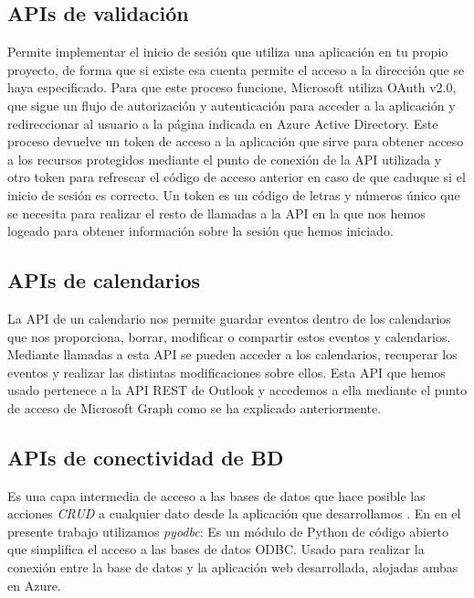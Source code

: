 \subsection{APIs de validación}
Permite implementar el inicio de sesión que utiliza una aplicación en tu propio proyecto, de forma que si existe esa cuenta permite el acceso a la dirección que se haya especificado. Para que este proceso funcione, Microsoft utiliza OAuth v2.0, que sigue un flujo de autorización y autenticación para acceder a la aplicación y redireccionar al usuario a la página indicada en Azure Active Directory. Este proceso devuelve un token de acceso a la aplicación que sirve para obtener acceso a los recursos protegidos mediante el punto de conexión de la API utilizada y otro token para refrescar el código de acceso anterior en caso de que caduque si el inicio de sesión es correcto. Un token es un código de letras y números único que se necesita para realizar el resto de llamadas a la API en la que nos hemos logeado para obtener información sobre la sesión que hemos iniciado.

\subsection{APIs de calendarios}
La API de un calendario nos permite guardar eventos dentro de los calendarios que nos proporciona, borrar, modificar o compartir estos eventos y calendarios. Mediante llamadas a esta API se pueden acceder a los calendarios, recuperar los eventos y realizar las distintas modificaciones sobre ellos. Esta API que hemos usado pertenece a la API REST de Outlook y accedemos a ella mediante el punto de acceso de Microsoft Graph como se ha explicado anteriormente.

\subsection{APIs de conectividad de BD}
Es una capa intermedia de acceso a las bases de datos que hace posible las acciones \textit{CRUD} a cualquier dato desde la aplicación que desarrollamos \cite{wiki:ODBC}. En en el presente trabajo utilizamos \textit{pyodbc}: Es un módulo de Python de código abierto que simplifica el acceso a las bases de datos ODBC. Usado para realizar la conexión entre la base de datos y la aplicación web desarrollada, alojadas ambas en Azure.

